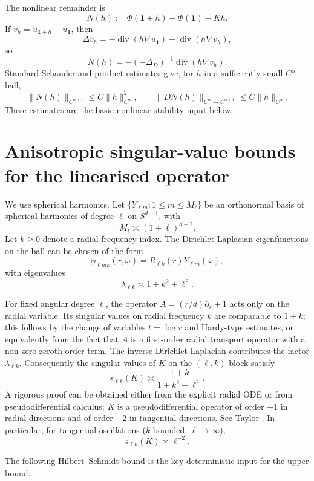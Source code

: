 \documentclass[11pt]{article}
\newcommand{\1}{\mathbf{1}}
\DeclareMathOperator{\diver}{div}
\begin{document}
The nonlinear remainder is
\[
N(h):=\Phi(\1+h)-\Phi(\1)-Kh.
\]
If $v_h=u_{\1+h}-u_{\1}$, then
\[
\Delta v_h=-\diver(h\nabla u_{\1})-\diver(h\nabla v_h),
\]
so
\[
N(h)=-(-\Delta_D)^{-1}\diver(h\nabla v_h).
\]
Standard Schauder and product estimates give, for $h$ in a sufficiently small $C^\alpha$ ball,
\begin{equation}\label{eq:Nquad}
\|N(h)\|_{C^{\alpha+1}}
\le C\|h\|_{C^\alpha}^2,
\qquad
\|DN(h)\|_{C^\alpha\to C^{\alpha+1}}
\le C\|h\|_{C^\alpha}.
\end{equation}
These estimates are the basic nonlinear stability input below.

\section{Anisotropic singular-value bounds for the linearised operator}

We use spherical harmonics. Let $\{Y_{\ell m}:1\le m\le M_\ell\}$ be an orthonormal basis of spherical harmonics of degree $\ell$ on $S^{d-1}$, with
\[
M_\ell\asymp (1+\ell)^{d-2}.
\]
Let $k\ge0$ denote a radial frequency index. The Dirichlet Laplacian eigenfunctions on the ball can be chosen of the form
\[
\phi_{\ell m k}(r,\omega)=R_{\ell k}(r)Y_{\ell m}(\omega),
\]
with eigenvalues
\[
\lambda_{\ell k}\asymp 1+k^2+\ell^2.
\]

For fixed angular degree $\ell$, the operator $A=(r/d)\partial_r+1$ acts only on the radial variable. Its singular values on radial frequency $k$ are comparable to $1+k$; this follows by the change of variables $t=\log r$ and Hardy-type estimates, or equivalently from the fact that $A$ is a first-order radial transport operator with a non-zero zeroth-order term. The inverse Dirichlet Laplacian contributes the factor $\lambda_{\ell k}^{-1}$. Consequently the singular values of $K$ on the $(\ell,k)$ block satisfy
\begin{equation}\label{eq:singblock}
s_{\ell k}(K)
\asymp
\frac{1+k}{1+k^2+\ell^2}.
\end{equation}
A rigorous proof can be obtained either from the explicit radial ODE or from pseudodifferential calculus; $K$ is a pseudodifferential operator of order $-1$ in radial directions and of order $-2$ in tangential directions. See Taylor \cite[Chapter VII]{Taylor}. In particular, for tangential oscillations ($k$ bounded, $\ell\to\infty$),
\[
s_{\ell k}(K)\asymp \ell^{-2}.
\]

The following Hilbert--Schmidt bound is the key deterministic input for the upper bound.
\end{document}
